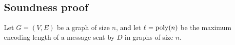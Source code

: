 \section{}
\subsection{Soundness proof}
\label{app:distprover}


Let $G = (V, E)$ be a graph of size $n$, and let $\ell = \operatorname{poly}(n)$ be the maximum encoding length of
a message sent by $D$ in graphs of size $n$.%


 

